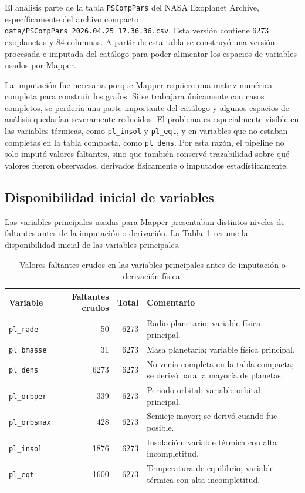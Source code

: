 El análisis parte de la tabla \texttt{PSCompPars} del NASA Exoplanet Archive, específicamente del archivo compacto \texttt{data/PSCompPars\_2026.04.25\_17.36.36.csv}. Esta versión contiene 6273 exoplanetas y 84 columnas. A partir de esta tabla se construyó una versión procesada e imputada del catálogo para poder alimentar los espacios de variables usados por Mapper.

La imputación fue necesaria porque Mapper requiere una matriz numérica completa para construir los grafos. Si se trabajara únicamente con casos completos, se perdería una parte importante del catálogo y algunos espacios de análisis quedarían severamente reducidos. El problema es especialmente visible en las variables térmicas, como \texttt{pl\_insol} y \texttt{pl\_eqt}, y en variables que no estaban completas en la tabla compacta, como \texttt{pl\_dens}. Por esta razón, el pipeline no solo imputó valores faltantes, sino que también conservó trazabilidad sobre qué valores fueron observados, derivados físicamente o imputados estadísticamente.

\subsection*{Disponibilidad inicial de variables}

Las variables principales usadas para Mapper presentaban distintos niveles de faltantes antes de la imputación o derivación. La Tabla~\ref{tab:raw_missing_values} resume la disponibilidad inicial de las variables principales.

\begin{table}[H]
\centering
\small
\begin{tabular}{lrrp{}}
\toprule
\textbf{Variable} & \textbf{Faltantes crudos} & \textbf{Total} & \textbf{Comentario} \\
\midrule
\texttt{pl\_rade} & 50 & 6273 & Radio planetario; variable física principal. \\
\texttt{pl\_bmasse} & 31 & 6273 & Masa planetaria; variable física principal. \\
\texttt{pl\_dens} & 6273 & 6273 & No venía completa en la tabla compacta; se derivó para la mayoría de planetas. \\
\texttt{pl\_orbper} & 339 & 6273 & Periodo orbital; variable orbital principal. \\
\texttt{pl\_orbsmax} & 428 & 6273 & Semieje mayor; se derivó cuando fue posible. \\
\texttt{pl\_insol} & 1876 & 6273 & Insolación; variable térmica con alta incompletitud. \\
\texttt{pl\_eqt} & 1600 & 6273 & Temperatura de equilibrio; variable térmica con alta incompletitud. \\
\bottomrule
\end{tabular}
\caption{Valores faltantes crudos en las variables principales antes de imputación o derivación física.}
\label{tab:raw_missing_values}
\end{table}

